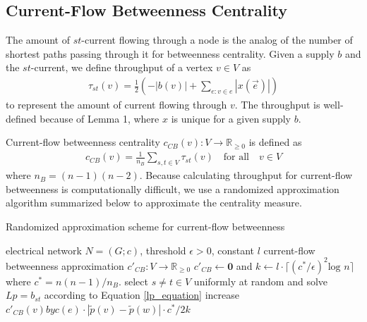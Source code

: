 \documentclass[10pt]{siamltex}
\begin{document}
\begin{pagewiselinenumbers}
     \subsection{Current-Flow Betweenness Centrality}
     The amount of $st$-current flowing through a node is the analog of the number of shortest paths passing through it for betweenness centrality. Given a supply $b$ and the $st$-current, we define throughput of a vertex $v \in V$ as
     \begin{align}
     \tau_{st}(v) = \frac{1}{2}\left( -\left|b(v) \right| + \sum_{e: v \in e} \left|x(\vec{e})\right|\right)
     \end{align}
     to represent the amount of current flowing through $v$. The throughput is well-defined because of Lemma 1, where $x$ is unique for a given supply $b$.
     
     Current-flow betweenness centrality $c_{CB}(v): V \rightarrow \mathbb{R}_{\geq 0}$ is defined as 
     \begin{align}
     c_{CB}(v) = \frac{1}{n_B} \sum_{s,t \in V} \tau_{st}(v) \quad \textrm{for all} \quad v \in V
     \end{align}
     where $n_B = (n-1)(n-2)$\cite{brandes2005centrality}. Because calculating throughput for current-flow betweenness is computationally difficult, we use a randomized approximation algorithm summarized below to approximate the centrality measure. 
\begin{algorithm}                      %
\caption{Randomized approximation scheme for current-flow betweenness \cite{brandes2005centrality}}          %
\label{alg1}                           %
\begin{algorithmic}                    %
    \REQUIRE electrical network $N = (G; c)$, threshold $\epsilon > 0$, constant $l$
\RETURN current-flow betweenness approximation $c'_{CB}: V \rightarrow \mathbb{R}_{\geq 0}$
   \STATE $c'_{CB} \leftarrow \mathbf{0}$ and $k \leftarrow l \cdot \lceil (c^*/\epsilon)^2 \textrm{log } n \rceil$ where $c^* = n(n-1)/n_B$.
   \STATE select $s \neq t \in V$ uniformly at random and solve $Lp = b_{st}$ according to Equation \ref{lp_equation}
   \STATE increase $c'_{CB}(v) by c(e) \cdot \left| \widetilde{p}(v) - \widetilde{p}(w) \right| \cdot c^*/2k$
   \ENDFOR
   \ENDFOR
   \ENDFOR
\end{algorithmic}
\end{algorithm}

\end{pagewiselinenumbers}
\end{document}
